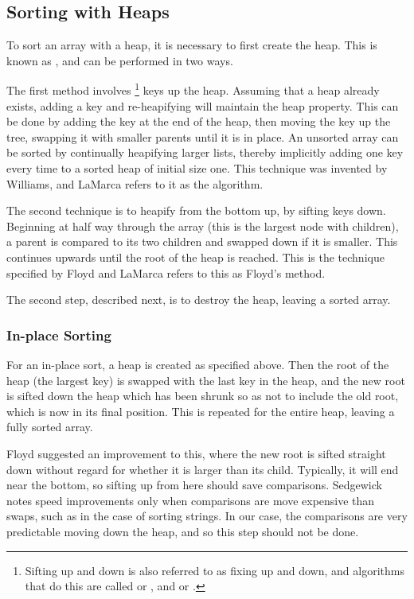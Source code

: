 \subsection{Sorting with Heaps}
To sort an array with a heap, it is necessary to first create the heap. This is
known as , and can be performed in two ways.

The first method involves \footnote{Sifting up and down is also
referred to as fixing up and down, and algorithms that do this are called
 or , and  or .} keys up the heap.
Assuming that a heap already exists, adding a key and re-heapifying will
maintain the heap property. This can be done by adding the key at the end of
the heap, then moving the key up the tree, swapping it with smaller parents
until it is in place. An unsorted array can be sorted by continually heapifying
larger lists, thereby implicitly adding one key every time to a sorted heap of
initial size one. This technique was invented by Williams, and LaMarca refers to
it as the  algorithm.

The second technique is to heapify from the bottom up, by sifting keys down.
Beginning at half way through the array (this is the largest node with children),
a parent is compared to its two children and swapped down if it is smaller. This
continues upwards until the root of the heap is reached. This is the technique
specified by Floyd and LaMarca refers to this as Floyd's method.

The second step, described next, is to destroy the heap, leaving a sorted array.

\subsubsection{In-place Sorting}
For an in-place sort, a heap is created as specified above. Then the root of the
heap (the largest key) is swapped with the last key in the heap, and the new
root is sifted down the heap which has been shrunk so as not to include the old
root, which is now in its final position. This is repeated for the entire heap,
leaving a fully sorted array.

Floyd suggested an improvement to this, where the new root is sifted straight
down without regard for whether it is larger than its child. Typically, it will
end near the bottom, so sifting up from here should save comparisons. Sedgewick
notes speed improvements only when comparisons are move expensive than swaps,
such as in the case of sorting strings. In our case, the comparisons are very
predictable moving down the heap, and so this step should not be done.

